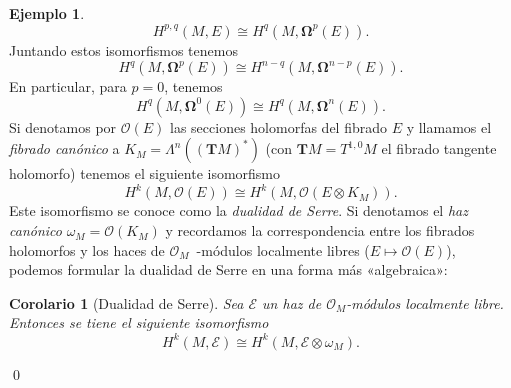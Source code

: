 \documentclass[12pt,a4paper]{article}
\newtheorem{corol}[thm]{Corolario}
\theoremstyle{definition} \newtheorem{defn}[thm]{Definición}
\theoremstyle{definition} \newtheorem{ejemplo}[thm]{Ejemplo}
\theoremstyle{definition} \newtheorem{ejercicio}[thm]{Ejercicio}
\theoremstyle{remark} \newtheorem*{obs}{Observación}
\newcommand{\bomega}{\boldsymbol{\Omega}}
\begin{document}
\begin{ejemplo}
\begin{equation*}
    H^{p,q}(M,E) \cong H^q(M,\bomega^p(E)).
  \end{equation*}
  Juntando estos isomorfismos tenemos 
  \begin{equation*}
    H^q(M,\bomega^p(E))\cong H^{n-q}(M,\bomega^{n-p}(E)).
  \end{equation*}
  En particular, para $p=0$, tenemos
  \begin{equation*}
    H^q(M,\bomega^0(E))\cong H^q(M,\bomega^n(E)).
  \end{equation*}
  Si denotamos por $\mathcal{O}(E)$ las secciones holomorfas del fibrado $E$ y llamamos el \emph{fibrado canónico} a $K_M=\Lambda^n((\mathbf{T}M)^*)$ (con $\mathbf{T}M=T^{1,0}M$ el fibrado tangente holomorfo) tenemos  el siguiente isomorfismo
  \begin{equation*}
    H^k(M,\mathcal{O}(E)) \cong H^k(M,\mathcal{O}(E\otimes K_M)).
  \end{equation*}
  Este isomorfismo se conoce como la \emph{dualidad de Serre}. 
Si denotamos el \emph{haz canónico} $\omega_M=\mathcal{O}(K_M)$ y recordamos la correspondencia entre los fibrados holomorfos y los haces de $\mathcal{O}_M$~-módulos localmente libres ($E\mapsto \mathcal{O}(E)$), podemos formular la dualidad de Serre en una forma más «algebraica»:
\begin{corol}[Dualidad de Serre]
  Sea $\mathcal{E}$ un haz de $\mathcal{O}_M$-módulos localmente libre. Entonces se tiene el siguiente isomorfismo
  \begin{equation*}
    H^k(M,\mathcal{E})\cong H^k(M,\mathcal{E}\otimes \omega_M).
  \end{equation*}
\end{corol}
\qed
\end{ejemplo}
\end{document}
